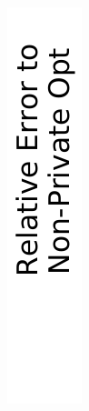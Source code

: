 

\begin{figure}[t]
  \captionsetup[subfigure]{justification=centering}
  \centering
  \begin{subfigure}{0.048\linewidth}
    \centering
    \includegraphics[width=\linewidth]{plots/xlegend.pdf}

\end{subfigure}
\end{figure}
